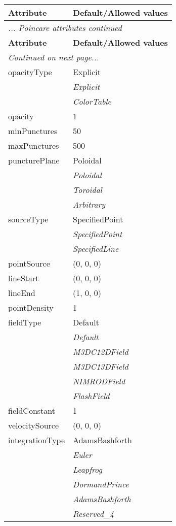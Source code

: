 \documentclass[10pt,a4paper]{report}
\begin{document}
\begin{longtable}{ll}
{\bf Attribute} & {\bf Default/Allowed values} \\
\hline \hline
\endfirsthead
\multicolumn{2}{l}{{\it ... Poincare attributes continued}} \\
{\bf Attribute} & {\bf Default/Allowed values} \\
\hline \hline
\endhead
\hline
\multicolumn{2}{l}{{\it Continued on next page...}} \\
\endfoot
\hline
\endlastfoot

opacityType  &  Explicit   \\
 & {\it  Explicit} \\
 & {\it  ColorTable} \\
opacity  &  1 \\
minPunctures  &  50 \\
maxPunctures  &  500 \\
puncturePlane  &  Poloidal   \\
 & {\it  Poloidal} \\
 & {\it  Toroidal} \\
 & {\it  Arbitrary} \\
sourceType  &  SpecifiedPoint   \\
 & {\it  SpecifiedPoint} \\
 & {\it  SpecifiedLine} \\
pointSource  &  (0, 0, 0) \\
lineStart  &  (0, 0, 0) \\
lineEnd  &  (1, 0, 0) \\
pointDensity  &  1 \\
fieldType  &  Default   \\
 & {\it  Default} \\
 & {\it  M3DC12DField} \\
 & {\it  M3DC13DField} \\
 & {\it  NIMRODField} \\
 & {\it  FlashField} \\
fieldConstant  &  1 \\
velocitySource  &  (0, 0, 0) \\
integrationType  &  AdamsBashforth   \\
 & {\it  Euler} \\
 & {\it  Leapfrog} \\
 & {\it  DormandPrince} \\
 & {\it  AdamsBashforth} \\
 & {\it  Reserved\_4} \\

\end{longtable}
\end{document}
